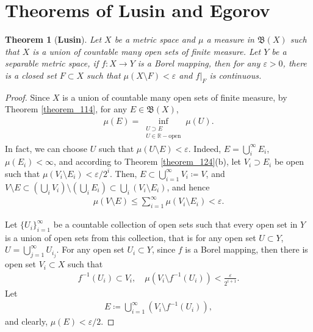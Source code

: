 \documentclass[11pt]{book}
\newtheorem{theorem}{Theorem}[chapter]
\theoremstyle{definition}
\numberwithin{equation}{chapter}
\begin{document}
\medskip

\section{Theorems of Lusin and Egorov}

\begin{theorem}[{\bf Lusin}]
Let $X$ be a metric space and $\mu$ a measure in $\mathfrak{B}(X)$ such that $X$ is a union of countable many open sets of finite measure. Let $Y$ be a separable metric space, if $f: X \to Y$ is a Borel mapping, then for any $\varepsilon > 0$, there is a closed set $F \subset X$ such that $\mu(X \setminus F) < \varepsilon$ and $f|_{F}$ is continuous.
\end{theorem}
\begin{proof}
Since $X$ is a union of countable many open sets of finite measure, by Theorem \ref{theorem_114}, for any $E \in \mathfrak{B}(X)$,
\begin{align*}
    \mu(E) = \inf_{\substack{U \supset E\\ U \in \mathbb{R} - \text{open}}} \mu(U).
\end{align*}
In fact, we can choose $U$ such that $\mu(U \setminus E) < \varepsilon$. Indeed, $E = \bigcup^\infty_i E_i$, $\mu(E_i) < \infty$, and according to Theorem \ref{theorem_124}(b), let $V_i \supset E_i$ be open such that $\mu(V_i \setminus E_i) < \varepsilon/2^i$. Then, $E \subset \bigcup^\infty_{i=1} V_i \coloneqq V$, and $V \setminus E \subset \left(\bigcup_{i} V_i\right) \setminus \left(\bigcup_{i} E_i\right) \subset \bigcup_i(V_i \setminus E_i)$, and hence
\begin{align*}
    \mu(V \setminus E) \leq \sum^\infty_{i=1} \mu(V_i \setminus E_i) < \varepsilon.
\end{align*}

Let $\{U_i\}^\infty_{i=1}$ be a countable collection of open sets such that every open set in $Y$ is a union of open sets from this collection, that is for any open set $U \subset Y$, $U = \bigcup^\infty_{j=1}U_{i_j}$. For any open set $U_i \subset Y$, since $f$ is a Borel mapping, then there is open set $V_i \subset X$ such that
\begin{align*}
    f^{-1}(U_i) \subset V_i, \quad \mu\left(V_i\setminus f^{-1}(U_i)\right) < \frac{\varepsilon}{2^{i+1}}.
\end{align*}
Let
\begin{align*}
    E \coloneqq \bigcup^\infty_{i=1} \left(V_i\setminus f^{-1}(U_i)\right),
\end{align*}
and clearly, $\mu(E) < \varepsilon/2$. 


\end{proof}
\end{document}
